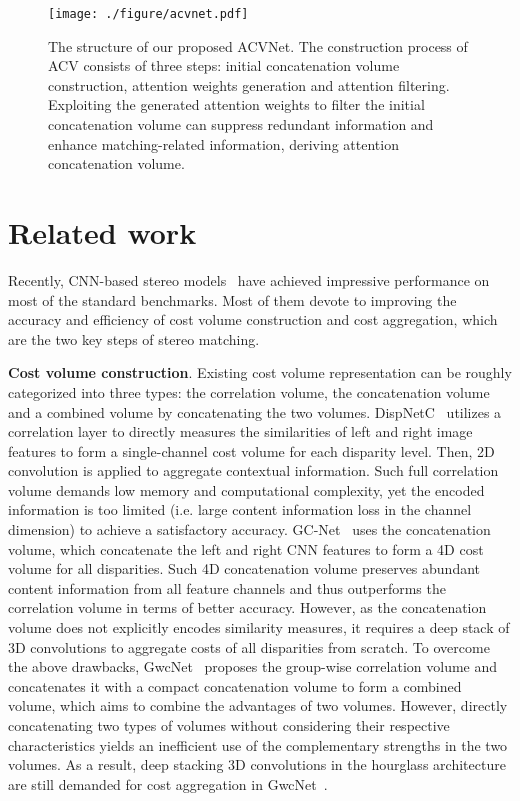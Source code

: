 \documentclass[10pt,twocolumn,letterpaper]{article}
\begin{document}
\begin{figure*}
\centering
\texttt{[image: ./figure/acvnet.pdf]} \caption{The structure of our proposed ACVNet. The construction process of ACV consists of three steps: initial concatenation volume construction, attention weights generation and attention filtering. Exploiting the generated attention weights to filter the initial concatenation volume can suppress redundant information and enhance matching-related information, deriving attention concatenation volume.
}
\label{fig:acvnet}
\vspace{-10pt}
\end{figure*} 
\section{Related work}\label{sec:Related work}
Recently, CNN-based stereo models~\cite{zbontar2015computing, dispNetC2016large,kendall2017end,guo2019group,nie2019multi, yang2019hierarchical} have achieved impressive performance on most of the standard benchmarks. 
Most of them devote to improving the accuracy and efficiency of cost volume construction and cost aggregation, which are the two key steps of stereo matching. 

\textbf{Cost volume construction}. Existing cost volume representation can be roughly categorized into three types: the correlation volume, the concatenation volume and a combined volume by concatenating the two volumes. 
DispNetC~\cite{dispNetC2016large} utilizes a correlation layer to directly measures the similarities of left and right image features to form a single-channel cost volume for each disparity level. Then, 2D convolution is applied to aggregate contextual information. Such full correlation volume demands low memory and computational complexity, yet the encoded information is too limited (i.e. large content information loss in the channel dimension) to achieve a satisfactory accuracy. GC-Net~\cite{kendall2017end} uses the concatenation volume, which concatenate the left and right CNN features to form a 4D cost volume for all disparities. Such 4D concatenation volume preserves abundant content information from all feature channels and thus outperforms the correlation volume in terms of better accuracy. However, as the concatenation volume does not explicitly encodes similarity measures, it requires a deep stack of 3D convolutions to aggregate costs of all disparities from scratch. 
To overcome the above drawbacks, GwcNet~\cite{guo2019group} proposes the group-wise correlation volume and concatenates it with a compact concatenation volume to form a combined volume, which aims to combine the advantages of two volumes.
However, directly concatenating two types of volumes without considering their respective characteristics yields an inefficient use of the complementary strengths in the two volumes. As a result, deep stacking 3D convolutions in the hourglass architecture are still demanded for cost aggregation in GwcNet~\cite{guo2019group}. 
\end{document}
